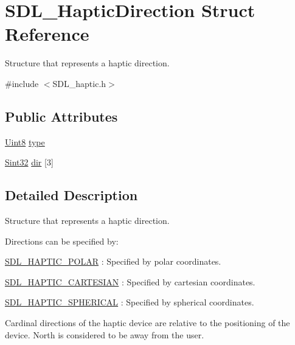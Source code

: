 \hypertarget{struct_s_d_l___haptic_direction}{\section{S\-D\-L\-\_\-\-Haptic\-Direction Struct Reference}
\label{struct_s_d_l___haptic_direction}
}


Structure that represents a haptic direction.  




{\ttfamily \#include $<$S\-D\-L\-\_\-haptic.\-h$>$}

\subsection*{Public Attributes}
\begin{DoxyCompactItemize}
\item 
\hyperlink{_s_d_l__stdinc_8h_a2944638813a090aa23e62f4da842c3e2}{Uint8} \hyperlink{struct_s_d_l___haptic_direction_acd6830ad68c4ba2af16057fa418087cc}{type}
\item 
\hyperlink{_s_d_l__stdinc_8h_a7a90b941db9d4582e9ad7abb9940ff7e}{Sint32} \hyperlink{struct_s_d_l___haptic_direction_a6cebd8118a3e61e36bd0c503ae020362}{dir} \mbox{[}3\mbox{]}
\end{DoxyCompactItemize}


\subsection{Detailed Description}
Structure that represents a haptic direction. 

Directions can be specified by\-:
\begin{DoxyItemize}
\item \hyperlink{_s_d_l__haptic_8h_acdc35e97e5525472054a67b76e518f3b}{S\-D\-L\-\_\-\-H\-A\-P\-T\-I\-C\-\_\-\-P\-O\-L\-A\-R} \-: Specified by polar coordinates.
\item \hyperlink{_s_d_l__haptic_8h_af8b2430a363a968de2a5b64c8f663d3b}{S\-D\-L\-\_\-\-H\-A\-P\-T\-I\-C\-\_\-\-C\-A\-R\-T\-E\-S\-I\-A\-N} \-: Specified by cartesian coordinates.
\item \hyperlink{_s_d_l__haptic_8h_a1fcf7cb0eaf3c39b16ba266054e25aff}{S\-D\-L\-\_\-\-H\-A\-P\-T\-I\-C\-\_\-\-S\-P\-H\-E\-R\-I\-C\-A\-L} \-: Specified by spherical coordinates.
\end{DoxyItemize}

Cardinal directions of the haptic device are relative to the positioning of the device. North is considered to be away from the user.

